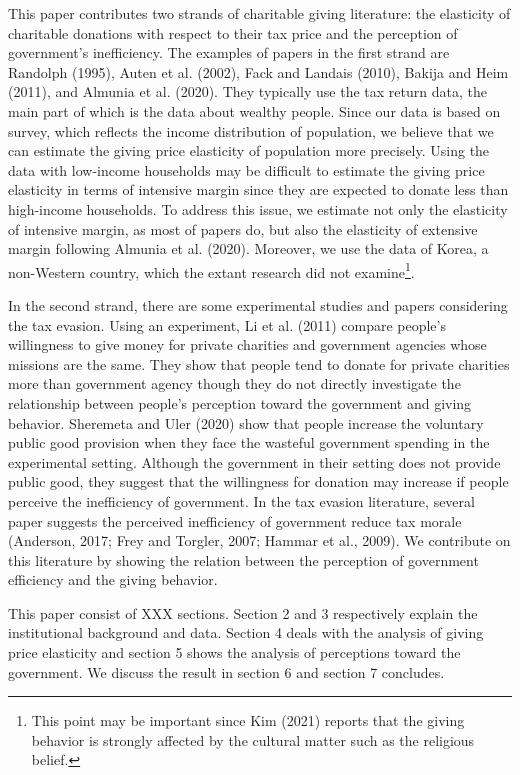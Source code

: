 \documentclass[ review  , 3p ]{elsarticle}
\begin{document}
  This paper contributes two strands of charitable giving literature: the elasticity of charitable donations with respect to their tax price and the perception of government's inefficiency. The examples of papers in the first strand are Randolph (1995), Auten et al. (2002), Fack and Landais (2010), Bakija and Heim (2011), and Almunia et al. (2020). They typically use the tax return data, the main part of which is the data about wealthy people. Since our data is based on survey, which reflects the income distribution of population, we believe that we can estimate the giving price elasticity of population more precisely. Using the data with low-income households may be difficult to estimate the giving price elasticity in terms of intensive margin since they are expected to donate less than high-income households. To address this issue, we estimate not only the elasticity of intensive margin, as most of papers do, but also the elasticity of extensive margin following Almunia et al. (2020).
  Moreover, we use the data of Korea, a non-Western country, which the extant research did not examine\footnote{This point may be important since Kim (2021) reports that the giving behavior is strongly affected by the cultural matter such as the religious belief.}.

  In the second strand, there are some experimental studies and papers considering the tax evasion. Using an experiment, Li et al. (2011) compare people's willingness to give money for private charities and government agencies whose missions are the same. They show that people tend to donate for private charities more than government agency though they do not directly investigate the relationship between people's perception toward the government and giving behavior. Sheremeta and Uler (2020) show that people increase the voluntary public good provision when they face the wasteful government spending in the experimental setting. Although the government in their setting does not provide public good, they suggest that the willingness for donation may increase if people perceive the inefficiency of government. In the tax evasion literature, several paper suggests the perceived inefficiency of government reduce tax morale (Anderson, 2017; Frey and Torgler, 2007; Hammar et al., 2009). We contribute on this literature by showing the relation between the perception of government efficiency and the giving behavior.

  This paper consist of XXX sections. Section 2 and 3 respectively explain the institutional background and data. Section 4 deals with the analysis of giving price elasticity and section 5 shows the analysis of perceptions toward the government. We discuss the result in section 6 and section 7 concludes.
\end{document}
